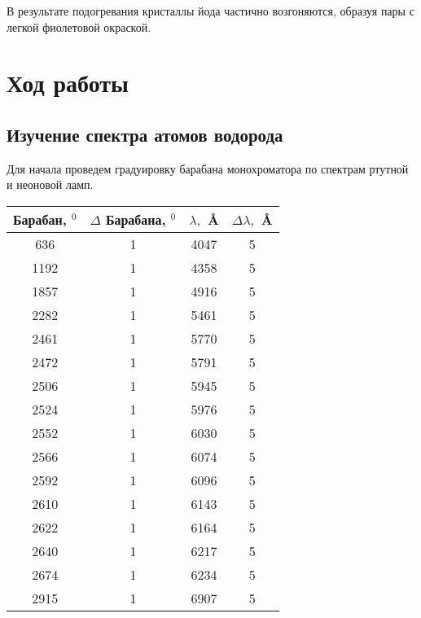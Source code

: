 \documentclass[a4paper, 12pt]{article}%
\begin{document}
В результате подогревания кристаллы йода частично возгоняются, образуя пары с легкой фиолетовой окраской.
\newpage
\section*{Ход работы}
\subsection*{Изучение спектра атомов водорода}
Для начала проведем градуировку барабана монохроматора по спектрам ртутной и неоновой ламп. 
\begin{table}[h]
\begin{center}
\begin{tabular}{|c|c|c|c|}
\hline
Барабан, $^{0}$ & $\Delta$ Барабана, $^{0}$ & $\lambda,$ \AA & $\Delta \lambda,$ \AA \\ \hline
636                 & 1                             & 4047           & 5                     \\ \hline
1192                & 1                             & 4358           & 5                     \\ \hline
1857                & 1                             & 4916           & 5                     \\ \hline
2282                & 1                             & 5461           & 5                     \\ \hline
2461                & 1                             & 5770           & 5                     \\ \hline
2472                & 1                             & 5791           & 5                     \\ \hline
2506                & 1                             & 5945           & 5                     \\ \hline
2524                & 1                             & 5976           & 5                     \\ \hline
2552                & 1                             & 6030           & 5                     \\ \hline
2566                & 1                             & 6074           & 5                     \\ \hline
2592                & 1                             & 6096           & 5                     \\ \hline
2610                & 1                             & 6143           & 5                     \\ \hline
2622                & 1                             & 6164           & 5                     \\ \hline
2640                & 1                             & 6217           & 5                     \\ \hline
2674                & 1                             & 6234           & 5                     \\ \hline
2915                & 1                             & 6907           & 5                     \\ \hline
\end{tabular}


\end{center}
\end{table}
\end{document}
